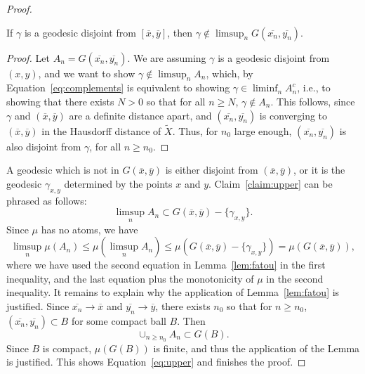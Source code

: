 \documentclass[10pt,a4paper]{amsart}
\newcommand*{\wt}[1]{\widetilde{#1}}
\begin{document}
\begin{proof}
\begin{claim}
If $\gamma$ is a geodesic disjoint from $[\overline{x},\overline{y}]$, then $\gamma \notin \limsup_{n} G(\overline{x_n},\overline{y_n})$.
\label{claim:upper}
\end{claim}
\begin{proof}
Let $A_n=G(\overline{x_n},\overline{y_n})$.
We are assuming $\gamma$ is a geodesic disjoint from $(x,y)$, and we want to show  $\gamma \notin \limsup_{n} A_n$, which, by Equation~\ref{eq:complements} is equivalent to showing
$\gamma \in \liminf_n A_n^c$, i.e., to showing that there exists $N > 0$ so that for all $n \geq N$, $\gamma \notin A_n$.
This follows, since $\gamma$ and $(\overline{x},\overline{y})$ are a definite distance apart, and $(\overline{x_n},\overline{y_n})$ is converging to $(\overline{x},\overline{y})$ in the Hausdorff distance of $\wt{X}$. Thus, for $n_0$ large enough, $(\overline{x_n},\overline{y_n})$ is also disjoint from $\gamma$, for all $n \geq n_0$.
\end{proof}
A geodesic which is not in $G(\overline{x},\overline{y})$ is either disjoint from $(\overline{x},\overline{y})$, or it is the geodesic $\gamma_{x,y}$ determined by the points $x$ and $y$.
Claim~\ref{claim:upper} can be phrased as follows:
\[
\limsup_{n}  A_n \subset G(\overline{x},\overline{y}) - \{ \gamma_{x,y} \}.
\]
Since $\mu$ has no atoms, we have
\[
\limsup_{n}  \mu(A_n ) \leq \mu(\limsup_{n} A_n ) \leq \mu( G(\overline{x},\overline{y}) - \{ \gamma_{x,y} \} ) = \mu( G(\overline{x},\overline{y})),
\]
where we have used the second equation in Lemma~\ref{lem:fatou} in the first inequality, and the last equation plus the monotonicity of $\mu$ in the second inequality.
It remains to explain why the application of Lemma~\ref{lem:fatou} is justified. Since $\overline{x_n} \to \overline{x}$ and $\overline{y_n} \to \overline{y}$, there exists $n_0$ so that for $n \geq n_0$, $(\overline{x_n},\overline{y_n}) \subset B$ for some compact ball $B$. Then \[\cup_{n \geq n_0} A_n \subset G(B).\]
Since $B$ is compact, $\mu(G(B))$ is finite, and thus the application of the Lemma is justified.
This shows Equation~\ref{eq:upper} and finishes the proof.
\end{proof}
\end{document}

